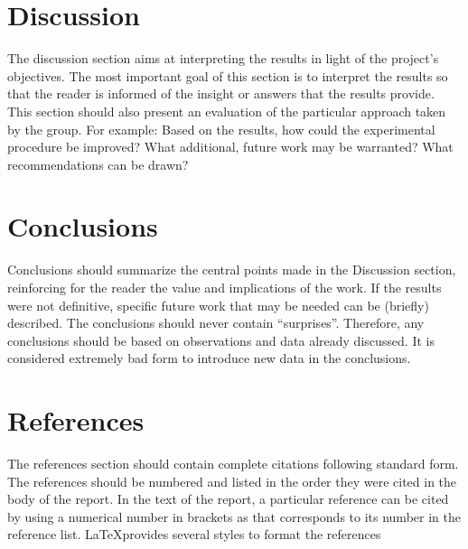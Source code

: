 \section{Discussion}
The discussion section aims at interpreting the results in light of the project's objectives. The most important goal of this section is to interpret the results so that the reader is informed of the insight or answers that the results provide. This section should also present an evaluation of the particular approach taken by the group. For example: Based on the results, how could the experimental procedure be improved? What additional, future work may be warranted? What recommendations can be drawn?


\section{Conclusions}
Conclusions should summarize the central points made in the Discussion section, reinforcing for the reader the value and implications of the work. If the results were not definitive, specific future work that may be needed can be (briefly) described. The conclusions should never contain ``surprises''. Therefore, any conclusions should be based on observations and data already discussed. It is considered extremely bad form to introduce new data in the conclusions.

\section*{References}

The references section should contain complete citations following standard form.  The references should be numbered and listed in the order they were cited in the body of the report. In the text of the report, a particular reference can be cited by using a numerical number in brackets as \cite{Lee2015} that corresponds to its number in the reference list. \LaTeX provides several styles to format the references




